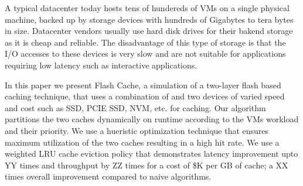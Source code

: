 A typical datacenter today hosts tens of hundereds of VMs on a single physical machine, backed up by storage devices with hundreds of Gigabytes to tera bytes in size. Datacenter vendors usually use hard disk drives for their bakend storage as it is cheap and reliable. The disadvantage of this type of storage is that the I/O accesses to these devices is very slow and are not suitable for applications requiring low latency such as interactive applications.

In this paper we present Flash Cache, a simulation of a two-layer flash based caching technique, that uses a combination of and two devices of varied speed and cost such as SSD, PCIE SSD, NVM, etc. for caching. Our algorithm partitions the two caches dynamically on runtime according to the VMs workload and their priority. We use a hueristic optimization technique that ensures maximum utilization of the two caches resulting in a high hit rate. We use a weighted LRU cache eviction policy that demonstrates latency improvement upto YY times and throughput by ZZ times for a cost of \$K per GB of cache; a XX times overall improvement compared to naive algorithms.

